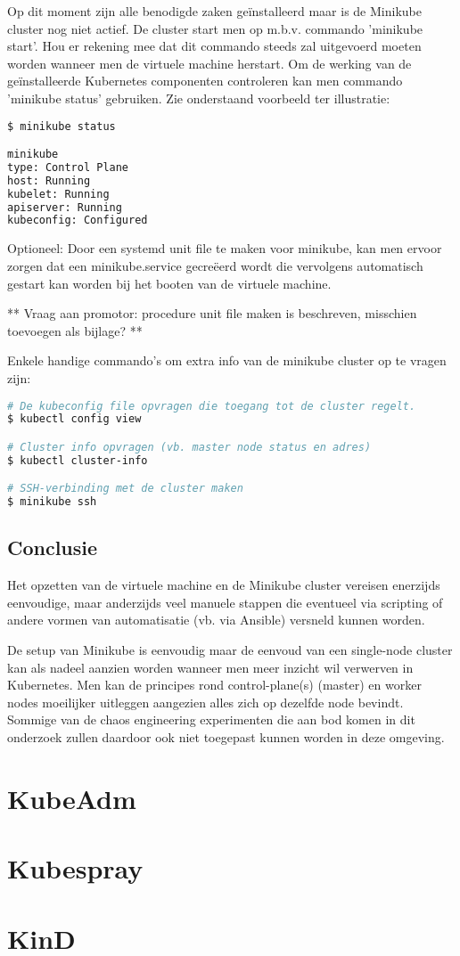 Op dit moment zijn alle benodigde zaken geïnstalleerd maar is de Minikube cluster nog niet actief. De cluster start men op m.b.v. commando 'minikube start'. Hou er rekening mee dat dit commando steeds zal uitgevoerd moeten worden wanneer men de virtuele machine herstart.
Om de werking van de geïnstalleerde Kubernetes componenten controleren kan men commando 'minikube status' gebruiken. Zie onderstaand voorbeeld ter illustratie: 
\begin{lstlisting}[language=bash]
$ minikube status

minikube
type: Control Plane
host: Running
kubelet: Running
apiserver: Running
kubeconfig: Configured
\end{lstlisting} 

Optioneel: Door een systemd unit file te maken voor minikube, kan men ervoor zorgen dat een minikube.service gecreëerd wordt die vervolgens automatisch gestart kan worden bij het booten van de virtuele machine. 

** Vraag aan promotor: procedure unit file maken is beschreven, misschien toevoegen als bijlage? **

Enkele handige commando's om extra info van de minikube cluster op te vragen zijn:
\begin{lstlisting}[language=bash]
# De kubeconfig file opvragen die toegang tot de cluster regelt.
$ kubectl config view 

# Cluster info opvragen (vb. master node status en adres)
$ kubectl cluster-info

# SSH-verbinding met de cluster maken
$ minikube ssh 
\end{lstlisting}

\subsection{Conclusie}

Het opzetten van de virtuele machine en de Minikube cluster vereisen enerzijds eenvoudige, maar anderzijds veel manuele stappen die eventueel via scripting of andere vormen van automatisatie (vb. via Ansible) versneld kunnen worden. 

De setup van Minikube is eenvoudig maar de eenvoud van een single-node cluster kan als nadeel aanzien worden wanneer men meer inzicht wil verwerven in Kubernetes. Men kan de principes rond control-plane(s) (master) en worker nodes moeilijker uitleggen aangezien alles zich op dezelfde node bevindt. 
Sommige van de chaos engineering experimenten die aan bod komen in dit onderzoek zullen daardoor ook niet toegepast kunnen worden in deze omgeving.  

\section{KubeAdm}



\section{Kubespray}

\section{KinD}

